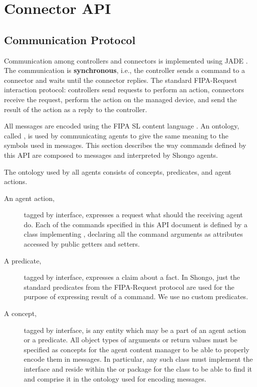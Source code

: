 \chapter{Connector API}



\section{Communication Protocol}

Communication among controllers and connectors is implemented using JADE \cite{jade}. The communication is \textbf{synchronous}, i.e., the controller sends a command to a connector and waits until the connector replies. The standard FIPA-Request \cite{FIPA-Request} interaction protocol: controllers send requests to perform an action, connectors receive the request, perform the action on the managed device, and send the result of the action as a reply to the controller.

All messages are encoded using the FIPA SL content language \cite{FIPA-SL}. An ontology, called , is used by communicating agents to give the same meaning to the symbols used in messages. This section describes the way commands defined by this API are composed to messages and interpreted by Shongo agents.

The ontology used by all agents consists of concepts, predicates, and agent actions.
\begin{description}
\item[An agent action,] tagged by  interface, expresses a request what should the receiving agent do. Each of the commands specified in this API document is defined by a class implementing , declaring all the command arguments as attributes accessed by public getters and setters.
\item[A predicate,] tagged by  interface, expresses a claim about a fact. In Shongo, just the standard predicates from the FIPA-Request protocol are used for the purpose of expressing result of a command. We use no custom predicates.
\item[A concept,] tagged by  interface, is any entity which may be a part of an agent action or a predicate. All object types of arguments or return values must be specified as concepts for the agent content manager to be able to properly encode them in messages. In particular, any such class must implement the  interface and reside within the  or  package for the  class to be able to find it and comprise it in the ontology used for encoding messages.
\end{description}



